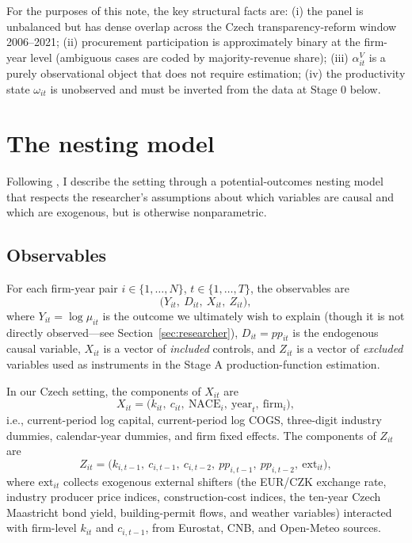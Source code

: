 \documentclass[11pt]{article}
\begin{document}
For the purposes of this note, the key structural facts are: (i) the panel is unbalanced but has dense overlap across the Czech transparency-reform window 2006--2021; (ii) procurement participation is approximately binary at the firm-year level (ambiguous cases are coded by majority-revenue share); (iii) $\alpha^V_{it}$ is a purely observational object that does not require estimation; (iv) the productivity state $\omega_{it}$ is unobserved and must be inverted from the data at Stage 0 below.

\section{The nesting model}\label{sec:nesting}

Following \citet[p.~1808]{ABGRS2025}, I describe the setting through a potential-outcomes nesting model that respects the researcher's assumptions about which variables are causal and which are exogenous, but is otherwise nonparametric.

\subsection{Observables}

For each firm-year pair $i \in \{1,\ldots,N\}$, $t \in \{1,\ldots,T\}$, the observables are
\begin{equation}\label{eq:obs}
\bigl(Y_{it},\ D_{it},\ X_{it},\ Z_{it}\bigr),
\end{equation}
where $Y_{it} = \log\mu_{it}$ is the outcome we ultimately wish to explain (though it is not directly observed---see Section~\ref{sec:researcher}), $D_{it} = pp_{it}$ is the endogenous causal variable, $X_{it}$ is a vector of \emph{included} controls, and $Z_{it}$ is a vector of \emph{excluded} variables used as instruments in the Stage A production-function estimation.

In our Czech setting, the components of $X_{it}$ are
\begin{equation}\label{eq:x}
X_{it} = \bigl(k_{it},\ c_{it},\ \text{NACE}_{i},\ \text{year}_{t},\ \text{firm}_{i}\bigr),
\end{equation}
i.e., current-period log capital, current-period log COGS, three-digit industry dummies, calendar-year dummies, and firm fixed effects. The components of $Z_{it}$ are
\begin{equation}\label{eq:z}
Z_{it} = \bigl(k_{i,t-1},\ c_{i,t-1},\ c_{i,t-2},\ pp_{i,t-1},\ pp_{i,t-2},\ \text{ext}_{it}\bigr),
\end{equation}
where $\text{ext}_{it}$ collects exogenous external shifters (the EUR/CZK exchange rate, industry producer price indices, construction-cost indices, the ten-year Czech Maastricht bond yield, building-permit flows, and weather variables) interacted with firm-level $k_{it}$ and $c_{i,t-1}$, from Eurostat, CNB, and Open-Meteo sources.
\end{document}
